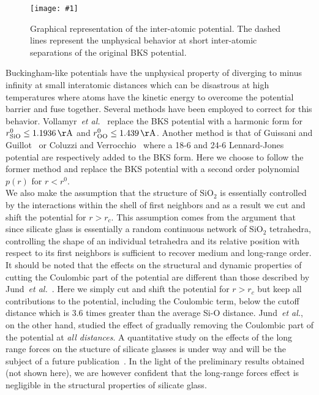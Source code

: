 \documentclass[aps,10pt,twocolumn]{revtex4}
\makeatletter
\newcommand{\etal}{\emph{et al.}\@\xspace}
\newcommand{\mrm}[1]{\ensuremath{\mathrm{#1}}\xspace}
\newcommand{\SiOTwo}{\ensuremath{\mrm{SiO_2}}\xspace}
\newlength{\picW}	%
\newcommand{\picA}{270}	%
\newcommand{\picL}[1]{\texttt{[image: \#1]}}
\newcommand{\angstrom}{\ensuremath{\mrm{\AA}}\xspace}
\makeatother
\begin{document}
\picW=8cm
\begin{figure}
\picL{fig01.ps}
\caption{Graphical representation of the inter-atomic potential. The dashed lines
represent the unphysical behavior at short inter-atomic separations of the original BKS potential.}
\label{fig:potBKS}
\end{figure}

Buckingham-like potentials have the unphysical property of diverging to minus infinity at
small interatomic distances which can be disastrous at high temperatures where atoms
have the kinetic energy to overcome the potential barrier and fuse together. Several methods
have been employed to correct for this behavior. Vollamyr~\etal~\cite{VollmayrKob96} replace the
BKS potential with a harmonic form for $r^0_{\mrm{SiO}} \leq 1.1936\, \angstrom$ and $r^0_{\mrm{OO}} \leq
1.439\, \angstrom$. Another method is that of Guissani and Guillot~\cite{GuissaniGuillot95} or Coluzzi and
Verrocchio~\cite{ColuzziVerrocchio02} where a 18-6 and 24-6 Lennard-Jones potential are
respectively added to the BKS form. Here we choose to follow the former method and replace the
BKS potential with a second order polynomial $p(r)$ for $r<r^0$.\\
We also make the assumption that the structure of \SiOTwo is essentially
controlled by the interactions within the shell of first neighbors and as a result we cut and shift
the potential for $r>r_c$. This assumption comes from the argument that since silicate glass is
essentially a random continuous network of \SiOTwo tetrahedra, controlling the shape of an individual
tetrahedra and its relative position with respect to its first neighbors is sufficient to recover
medium and long-range order.\\
It should be noted that the effects on the structural and dynamic properties of cutting the
Coulombic part of the potential are different than those described by
Jund~\etal~\cite{JundRarivo00}. Here we simply cut and shift the potential for
$r>r_c$ but keep all contributions to the potential, including the Coulombic term, below the
cutoff distance which is 3.6 times greater than the average Si-O distance. Jund~\etal, on the other hand,
studied the  effect of gradually removing the Coulombic part of the potential at \emph{all
distances}. A quantitative study on the effects of the long range forces on the stucture of
silicate glasses is under way and will be the subject of a future publication~\cite{HalversonBarmes07}.
In the light of the preliminary results obtained (not shown here), we are however confident that
the long-range forces effect is negligible in the structural properties of silicate glass.
\end{document}
